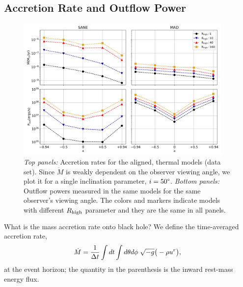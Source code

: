 \subsection{Accretion Rate and Outflow Power}


\begin{figure}
\centering
\includegraphics[width=0.95\textwidth]{figures/illinoisv3_average_mdot_pout.png}
\caption{{\it Top panels:} Accretion rates for the aligned, thermal models (\kharma data set). Since $\dot{M}$ is weakly dependent on the observer viewing angle, we plot it for a single inclination parameter, $i=50\degree$. {\it Bottom panels:} Outflow powers measured in the same models for the same observer's viewing angle. The colors and markers indicate models with different $R_\mathrm{high}$ parameter and they are the same in all panels.}
\label{fig:accretion_outflow_power_illinois_thermal}
\end{figure}

What is the mass accretion rate onto \sgra black hole?
We define the time-averaged accretion rate,
\begin{equation}
    \dot{M} = \frac{1}{\Delta t}\int dt\int d\theta d\phi\hspace{0.1cm}\sqrt{-g}\big(-\rho u^{r}\big),
\end{equation}
at the event horizon; the quantity in the parenthesis is the inward rest-mass energy flux.

